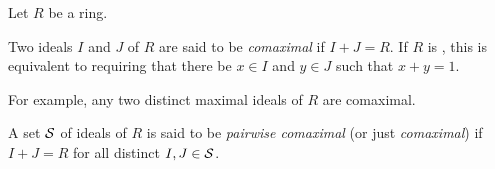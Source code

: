 \documentclass[12pt]{article}
\begin{document}

Let $R$ be a ring.

Two ideals $I$ and $J$ of $R$ are said to be \emph{comaximal} if $I + J = R$.
If $R$ is , this is equivalent to requiring that
there be $x\in I$ and $y\in J$ such that $x+y=1$.

For example, any two distinct maximal ideals of $R$ are comaximal.

A set $\cal S$ of ideals of $R$ is said to be \emph{pairwise comaximal} (or just \emph{comaximal}) if $I+J=R$ for all distinct $I,J\in\cal S$.
\end{document}
